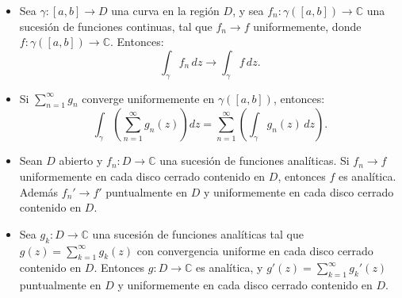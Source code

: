 \documentclass[spanish,presentation]{beamer}
\begin{document}
\begin{frame}[label=sec-2-1]{}
\begin{theorem}
\begin{itemize}
\item Sea \(\gamma\colon [a,b]\to D\) una curva en la región \(D\), y
sea \(f_{n}\colon \gamma([a,b])\to \mathbb{C}\) una sucesión de
funciones continuas, tal que \(f_{n}\to f\) uniformemente, donde
\(f\colon \gamma([a,b])\to \mathbb{C}\). Entonces:
\begin{displaymath}
\int_{\gamma}f_{n}\,dz\to \int_{\gamma}f\,dz.
\end{displaymath}
\item Si \(\sum_{n=1}^{\infty}g_{n}\) converge uniformemente en
\(\gamma([a,b])\), entonces:
\begin{displaymath}
\int_{\gamma}\left(\sum_{n=1}^{\infty}g_{n}(z)\right)dz=\sum_{n=1}^{\infty}\left(\int_{\gamma} g_{n}(z)\,dz\right).
\end{displaymath}
\end{itemize}
\end{theorem}
\end{frame}

\begin{frame}[label=sec-2-2]{}
\begin{theorem}
\begin{itemize}
\item Sean \(D\) abierto y \(f_{n}\colon D\to \mathbb{C}\) una
sucesión de funciones analíticas. Si \(f_{n}\to f\)
uniformemente en cada disco cerrado contenido en \(D\), entonces
\(f\) es analítica. Además \(f_{n}'\to f'\) puntualmente en
\(D\) y uniformemente en cada disco cerrado contenido en \(D\).

\item Sea \(g_{k}\colon D\to \mathbb{C}\) una sucesión de funciones
analíticas tal que \(g(z)=\sum_{k=1}^{\infty}g_{k}(z)\) con
convergencia uniforme en cada disco cerrado contenido en
\(D\). Entonces \(g\colon D\to \mathbb{C}\) es analítica, y
\(g'(z)=\sum_{k=1}^{\infty}g_{k}'(z)\) puntualmente en \(D\) y
uniformemente en cada disco cerrado contenido en \(D\).
\end{itemize}
\end{theorem}
\end{frame}
\end{document}
